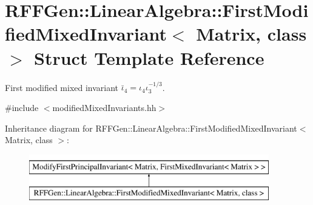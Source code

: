 \hypertarget{structRFFGen_1_1LinearAlgebra_1_1FirstModifiedMixedInvariant}{\section{R\-F\-F\-Gen\-:\-:Linear\-Algebra\-:\-:First\-Modified\-Mixed\-Invariant$<$ Matrix, class $>$ Struct Template Reference}
\label{structRFFGen_1_1LinearAlgebra_1_1FirstModifiedMixedInvariant}
}


First modified mixed invariant $\bar\iota_4=\iota_4\iota_3^{-1/3}$.  




{\ttfamily \#include $<$modified\-Mixed\-Invariants.\-hh$>$}

Inheritance diagram for R\-F\-F\-Gen\-:\-:Linear\-Algebra\-:\-:First\-Modified\-Mixed\-Invariant$<$ Matrix, class $>$\-:\begin{figure}[H]
\begin{center}
\leavevmode
\includegraphics[height=2.000000cm]{structRFFGen_1_1LinearAlgebra_1_1FirstModifiedMixedInvariant}
\end{center}
\end{figure}
